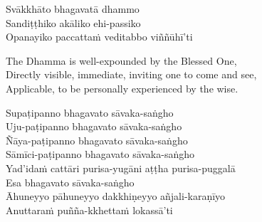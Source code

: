 \begin{pali-hang-continued}
  Svākkhāto bhagavatā dhammo\\
  Sandiṭṭhiko akāliko ehi-passiko\\
  Opanayiko paccattaṁ veditabbo viññūhī'ti
\end{pali-hang-continued}

\begin{english-verses}
  The Dhamma is well-expounded by the Blessed One,\\
  Directly visible, immediate, inviting one to come and see,\\
  Applicable, to be personally experienced by the wise.
\end{english-verses}

\begin{pali-hang-continued}
  Supaṭipanno bhagavato sāvaka-saṅgho\\
  Uju-paṭipanno bhagavato sāvaka-saṅgho\\
  Ñāya-paṭipanno bhagavato sāvaka-saṅgho\\
  Sāmīci-paṭipanno bhagavato sāvaka-saṅgho\\
  Yad'idaṁ cattāri purisa-yugāni aṭṭha purisa-puggalā\\
  Esa bhagavato sāvaka-saṅgho\\
  Āhuneyyo pāhuneyyo dakkhiṇeyyo añjali-karaṇīyo\\
  Anuttaraṁ puñña-kkhettaṁ lokassā'ti
\end{pali-hang-continued}


